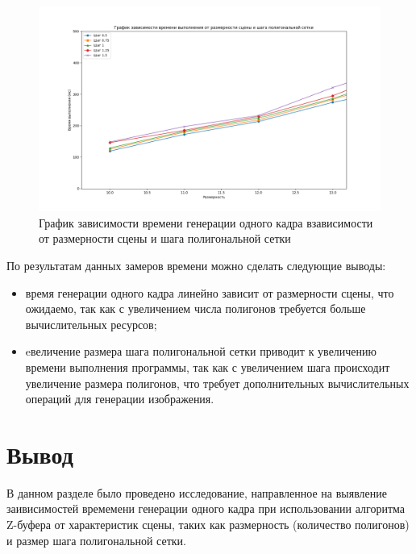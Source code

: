 \begin{figure}[h]
    \centering
    \includegraphics[width=1.1\linewidth]{img/graph1.png}
    \caption{График зависимости времени генерации одного кадра взависимости от размерности сцены и шага полигональной сетки}
    \label{img:graph1}
\end{figure}
\noindent

По результатам данных замеров времени можно сделать следующие выводы:
\begin{itemize}
    \item время генерации одного кадра линейно зависит от размерности сцены, что ожидаемо, так как с 
    увеличением числа полигонов требуется больше вычислительных ресурсов;
    \item eвеличение размера шага полигональной сетки приводит к увеличению времени выполнения программы, так как
    с увеличением шага происходит увеличение размера полигонов, что требует дополнительных вычислительных операций для генерации изображения. 
\end{itemize}

\section{Вывод}
В данном разделе было проведено исследование, направленное на выявление заивисимостей времемени генерации одного кадра
при использовании алгоритма Z-буфера от характеристик сцены, таких как размерность (количество полигонов) и размер шага полигональной сетки.

